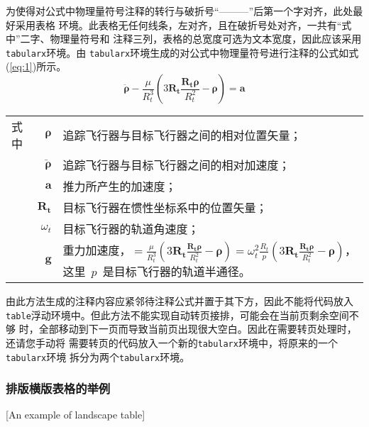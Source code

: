 为使得对公式中物理量符号注释的转行与破折号“———”后第一个字对齐，此处最好采用表格
环境。此表格无任何线条，左对齐，且在破折号处对齐，一共有“式中”二字、物理量符号和
注释三列，表格的总宽度可选为文本宽度，因此应该采用\verb|tabularx|环境。由
\verb|tabularx|环境生成的对公式中物理量符号进行注释的公式如式(\ref{eq:1})所示。
\begin{equation}\label{eq:1}
	\ddot{\boldsymbol{\rho}}-\frac{\mu}{R_{t}^{3}}\left(3\mathbf{R_{t}}\frac{\mathbf{R_{t}\rho}}{R_{t}^{2}}-\boldsymbol{\rho}\right)=\mathbf{a}
\end{equation}
\begin{tabularx}{\textwidth}{@{}l@{\quad}r@{———}X@{}}
	式中 & $\boldsymbol{\rho}$        & 追踪飞行器与目标飞行器之间的相对位置矢量；               \\
	   & $\boldsymbol{\ddot{\rho}}$ & 追踪飞行器与目标飞行器之间的相对加速度；                \\
	   & $\mathbf{a}$               & 推力所产生的加速度；                          \\
	   & $\mathbf{R_t}$             & 目标飞行器在惯性坐标系中的位置矢量；                  \\
	   & $\omega_{t}$               & 目标飞行器的轨道角速度；                        \\
	   & $\mathbf{g}$               & 重力加速度，$=\frac{\mu}{R_{t}^{3}}\left(
		3\mathbf{R_{t}}\frac{\mathbf{R_{t}\rho}}{R_{t}^{2}}-\boldsymbol{\rho}\right)=\omega_{t}^{2}\frac{R_{t}}{p}\left(
		3\mathbf{R_{t}}\frac{\mathbf{R_{t}\rho}}{R_{t}^{2}}-\boldsymbol{\rho}\right)$，这里~$p$~是目标飞行器的轨道半通径。
\end{tabularx}\vspace{3.15bp}
由此方法生成的注释内容应紧邻待注释公式并置于其下方，因此不能将代码放入
\verb|table|浮动环境中。但此方法不能实现自动转页接排，可能会在当前页剩余空间不够
时，全部移动到下一页而导致当前页出现很大空白。因此在需要转页处理时，还请您手动将
需要转页的代码放入一个新的\verb|tabularx|环境中，将原来的一个\verb|tabularx|环境
拆分为两个\verb|tabularx|环境。

\subsubsection{排版横版表格的举例}[An example of landscape table]

